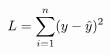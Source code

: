 \documentclass[preview]{standalone}
\begin{document}
\begin{align*}
\special{dvisvgm:raw <g id='unique000'>}L=\sum^n_{i=1}(y-\hat{y})^2\special{dvisvgm:raw </g>}
\end{align*}
\end{document}
